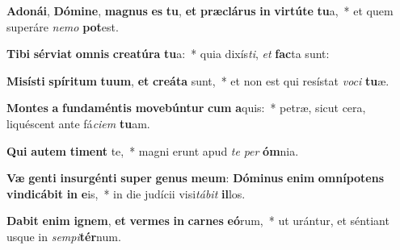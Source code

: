 \item \textbf{A}\textbf{do}\textbf{ná}\textbf{i}, \textbf{Dó}\textbf{mi}\textbf{ne}, \textbf{ma}\textbf{gnus} \textbf{es} \textbf{tu}, \textbf{et} \textbf{præ}\textbf{clá}\textbf{rus} \textbf{in} \textbf{vir}\textbf{tú}\textbf{te} \textbf{tu}a,~* et quem superáre \textit{ne}\textit{mo} \textbf{pot}est.
\item \textbf{Ti}\textbf{bi} \textbf{sér}\textbf{vi}\textbf{at} \textbf{om}\textbf{nis} \textbf{cre}\textbf{a}\textbf{tú}\textbf{ra} \textbf{tu}a:~* quia dixís\textit{ti}, \textit{et} \textbf{fac}ta sunt:
\item \textbf{Mi}\textbf{sís}\textbf{ti} \textbf{spí}\textbf{ri}\textbf{tum} \textbf{tu}\textbf{um}, \textbf{et} \textbf{cre}\textbf{á}\textbf{ta} sunt,~* et non est qui resístat \textit{vo}\textit{ci} \textbf{tu}æ.
\item \textbf{Mon}\textbf{tes} \textbf{a} \textbf{fun}\textbf{da}\textbf{mén}\textbf{tis} \textbf{mo}\textbf{ve}\textbf{bún}\textbf{tur} \textbf{cum} \textbf{a}quis:~* petræ, sicut cera, liquéscent ante fá\textit{ci}\textit{em} \textbf{tu}am.
\item \textbf{Qui} \textbf{au}\textbf{tem} \textbf{ti}\textbf{ment} te,~* magni erunt apud \textit{te} \textit{per} \textbf{óm}nia.
\item \textbf{Væ} \textbf{gen}\textbf{ti} \textbf{in}\textbf{sur}\textbf{gén}\textbf{ti} \textbf{su}\textbf{per} \textbf{ge}\textbf{nus} \textbf{me}\textbf{um}: \textbf{Dó}\textbf{mi}\textbf{nus} \textbf{e}\textbf{nim} \textbf{om}\textbf{ní}\textbf{pot}\textbf{ens} \textbf{vin}\textbf{di}\textbf{cá}\textbf{bit} \textbf{in} \textbf{e}is,~* in die judícii visi\textit{tá}\textit{bit} \textbf{il}los.
\item \textbf{Da}\textbf{bit} \textbf{e}\textbf{nim} \textbf{i}\textbf{gnem}, \textbf{et} \textbf{ver}\textbf{mes} \textbf{in} \textbf{car}\textbf{nes} \textbf{e}\textbf{ó}rum,~* ut urántur, et séntiant usque in \textit{sem}\textit{pi}\textbf{tér}num.
